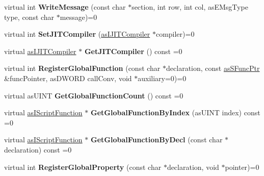 \begin{DoxyCompactItemize}
virtual int {\bfseries Write\+Message} (const char $\ast$section, int row, int col, as\+E\+Msg\+Type type, const char $\ast$message)=0
\item 
\mbox{\label{classas_i_script_engine_aee4f910163604203a27db1ffea3b1c9c}} 
virtual int {\bfseries Set\+J\+I\+T\+Compiler} (\hyperlink{classas_i_j_i_t_compiler}{as\+I\+J\+I\+T\+Compiler} $\ast$compiler)=0
\item 
\mbox{\label{classas_i_script_engine_a2fb6db9085df3c7d487c0d58de76bb83}} 
virtual \hyperlink{classas_i_j_i_t_compiler}{as\+I\+J\+I\+T\+Compiler} $\ast$ {\bfseries Get\+J\+I\+T\+Compiler} () const =0
\item 
\mbox{\label{classas_i_script_engine_a2f84b9b51733f22c68b8448b02c2f1c7}} 
virtual int {\bfseries Register\+Global\+Function} (const char $\ast$declaration, const \hyperlink{structas_s_func_ptr}{as\+S\+Func\+Ptr} \&func\+Pointer, as\+D\+W\+O\+RD call\+Conv, void $\ast$auxiliary=0)=0
\item 
\mbox{\label{classas_i_script_engine_a72aa1a3a5ac88a5a1dba4fa3655141d6}} 
virtual as\+U\+I\+NT {\bfseries Get\+Global\+Function\+Count} () const =0
\item 
\mbox{\label{classas_i_script_engine_aaf2b79cef75adb4099a24e3412e4ea79}} 
virtual \hyperlink{classas_i_script_function}{as\+I\+Script\+Function} $\ast$ {\bfseries Get\+Global\+Function\+By\+Index} (as\+U\+I\+NT index) const =0
\item 
\mbox{\label{classas_i_script_engine_a42edd02e95731c795e13706400e8665a}} 
virtual \hyperlink{classas_i_script_function}{as\+I\+Script\+Function} $\ast$ {\bfseries Get\+Global\+Function\+By\+Decl} (const char $\ast$declaration) const =0
\item 
\mbox{\label{classas_i_script_engine_aacd32f32b2922b8ffaed204812013169}} 
virtual int {\bfseries Register\+Global\+Property} (const char $\ast$declaration, void $\ast$pointer)=0
\item 
\mbox{\label{classas_i_script_engine_aa69f6b37f9c7bdf9b52b9c1692daf048}} 

\end{DoxyCompactItemize}
